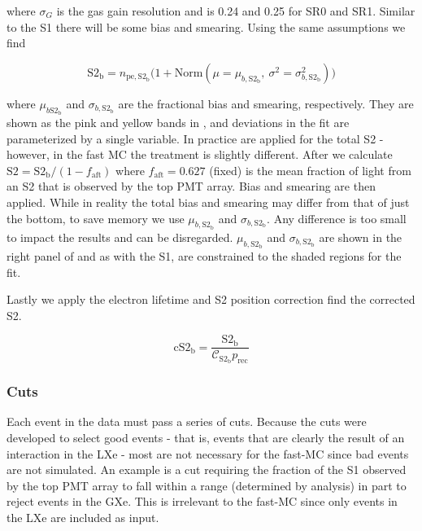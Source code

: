 \noindent where $\sigma_G$ is the gas gain resolution and is 0.24 and 0.25 for SR0 and SR1.  Similar to the S1 there will be some bias and
smearing.  Using the same assumptions we find

\begin{equation}
\mathrm{S2_b} = n_{\mathrm{pe,S2_b}} \Big( 1 + \mathrm{Norm}(\mu = \mu_{b, \mathrm{S2_b}},\ \sigma^2 = \sigma_{b, \mathrm{S2_b}}^2) \Big)
\label{eq:er_nr_calibrations_parameter_determ_det_phys_s2_bias_smear}
\end{equation}

\noindent where $\mu_{b \mathrm{S2_b}}$ and $\sigma_{b, \mathrm{S2_b}}$ are the \stwob fractional bias and smearing,
respectively.  They are shown as the pink and yellow bands in , and
deviations in the fit are parameterized by a single variable.  In
practice  are applied
for the total S2 - however, in the fast MC the treatment is slightly different.  After
 we calculate
$\mathrm{S2} = \mathrm{S2_b} / (1 - f_{\mathrm{aft}})$ where $f_{\mathrm{aft}} = 0.627$ (fixed) is the mean fraction of light from an
S2 that
is observed by the top PMT array.  Bias and smearing are then applied.  While in reality the total bias and smearing
may differ from that of just the bottom, to save memory we use $\mu_{b, \mathrm{S2_b}}$ and $\sigma_{b, \mathrm{S2_b}}$.  Any
difference is too small to impact the results and can be disregarded.  $\mu_{b, \mathrm{S2_b}}$ and $\sigma_{b, \mathrm{S2_b}}$ are shown
in the right panel of  and as with the S1, are constrained to the
shaded regions for the fit.

Lastly we apply the electron lifetime and S2 position correction find the corrected S2.

\begin{equation}
\mathrm{cS2_b} = \frac{\mathrm{S2_b}}{\mathcal{C}_{\mathrm{S2_b}} p_{\mathrm{rec}}}
\end{equation}



\subsubsection{Cuts}
\label{subsubsec:er_nr_calibrations_parameter_determ_cuts}
Each event in the data must pass a series of cuts.  Because the cuts were developed to select good events - that is, events that are
clearly the result of an interaction in the LXe - most are not necessary for the fast-MC since bad events are not simulated.  An example
is a cut requiring the fraction of the S1 observed by the top PMT array to fall within a range (determined by analysis) in part to reject
events in the GXe.  This is irrelevant to the fast-MC since only events in the LXe are included as input.

